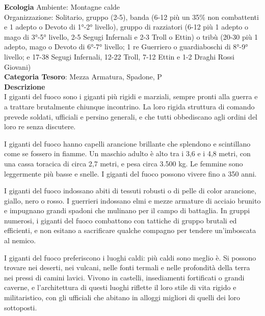 \begin{multicols}{2}
{\textbf{Ecologia}
Ambiente: Montagne calde\\
Organizzazione: Solitario, gruppo (2-5), banda (6-12 più un 35\% non combattenti e 1 adepto o Devoto di 1°-2° livello), gruppo di razziatori (6-12 più 1 adepto o mago di 3°-5° livello, 2-5 Segugi Infernali e 2-3 Troll o Ettin) o tribù (20-30 più 1 adepto, mago o Devoto di 6°-7° livello; 1 re Guerriero o guardiaboschi di 8°-9° livello; e 17-38 Segugi Infernali, 12-22 Troll, 7-12 Ettin e 1-2 Draghi Rossi Giovani)\\
\textbf{Categoria Tesoro}: Mezza Armatura, Spadone, P\\
\textbf{Descrizione}\\
I giganti del fuoco sono i giganti più rigidi e marziali, sempre pronti alla guerra e a trattare brutalmente chiunque incontrino. La loro rigida struttura di comando prevede soldati, ufficiali e persino generali, e che tutti obbediscano agli ordini del loro re senza discutere.

I giganti del fuoco hanno capelli arancione brillante che splendono e scintillano come se fossero in fiamme. Un maschio adulto è alto tra i 3,6 e i 4,8 metri, con una cassa toracica di circa 2,7 metri, e pesa circa 3.500 kg. Le femmine sono leggermente più basse e snelle. I giganti del fuoco possono vivere fino a 350 anni.

I giganti del fuoco indossano abiti di tessuti robusti o di pelle di color arancione, giallo, nero o rosso. I guerrieri indossano elmi e mezze armature di acciaio brunito e impugnano grandi spadoni che mulinano per il campo di battaglia. In gruppi numerosi, i giganti del fuoco combattono con tattiche di gruppo brutali ed efficienti, e non esitano a sacrificare qualche compagno per tendere un'imboscata al nemico.

I giganti del fuoco preferiscono i luoghi caldi: più caldi sono meglio è. Si possono trovare nei deserti, nei vulcani, nelle fonti termali e nelle profondità della terra nei pressi di camini lavici. Vivono in castelli, insediamenti fortificati o grandi caverne, e l'architettura di questi luoghi riflette il loro stile di vita rigido e militaristico, con gli ufficiali che abitano in alloggi migliori di quelli dei loro sottoposti.

}
\end{multicols}

